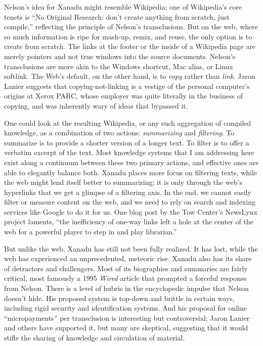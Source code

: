 Nelson's idea for Xanadu might resemble Wikipedia; one of Wikipedia's core tenets is ``No Original Research: don't create anything from scratch, just compile,'' reflecting the principle of Nelson's transclusions.\autocite[11-12]{reagle_good_2010} But on the web, where so much information is ripe for mash-up, remix, and reuse, the only option is to create from scratch. The links at the footer or the inside of a Wikipedia page are merely pointers and not true windows into the source documents. Nelson's transclusions are more akin to the Windows shortcut, Mac alias, or Linux softlink. The Web's default, on the other hand, is to \emph{copy} rather than \emph{link}. Jaron Lanier suggests that copying-not-linking is a vestige of the personal computer's origins at Xerox PARC, whose employer was quite literally in the business of copying, and was inherently wary of ideas that bypassed it.\autocite[221-232]{lanier_who_2013}

One could look at the resulting Wikipedia, or any such aggregation of compiled knowledge, as a combination of two actions: \emph{summarizing} and \emph{filtering}. To summarize is to provide a shorter version of a longer text. To filter is to offer a verbatim excerpt of the text. Most knowledge systems that I am addressing here exist along a continuum between these two primary actions, and effective ones are able to elegantly balance both. Xanadu places more focus on filtering texts, while the web might lend itself better to summarizing; it is only through the web's hyperlinks that we get a glimpse of a filtering axis. In the end, we cannot easily filter or measure content on the web, and we need to rely on search and indexing services like Google to do it for us. One blog post by the Tow Center's NewsLynx project laments, ``the inefficiency of one-way links left a hole at the center of the web for a powerful player to step in and play librarian.''\autocite{abelson_hyper-compensation:_2014}

But unlike the web, Xanadu has still not been fully realized. It has lost, while the web has experienced an unprecedented, meteoric rise. Xanadu also has its share of detractors and challengers. Most of its biographies and summaries are fairly critical, most famously a 1995 \emph{Wired} article that prompted a forceful response from Nelson.\autocite{wolf_curse_1995} There is a level of hubris in the encyclopedic impulse that Nelson doesn't hide. His proposed system is top-down and brittle in certain ways, including rigid security and identification systems. And his proposal for online ``micropayments'' per transclusion is interesting but controversial; Jaron Lanier and others have supported it, but many are skeptical, suggesting that it would stifle the sharing of knowledge and circulation of material.\autocite[221-232]{atwood_xanadu_2009,lanier_who_2013}

